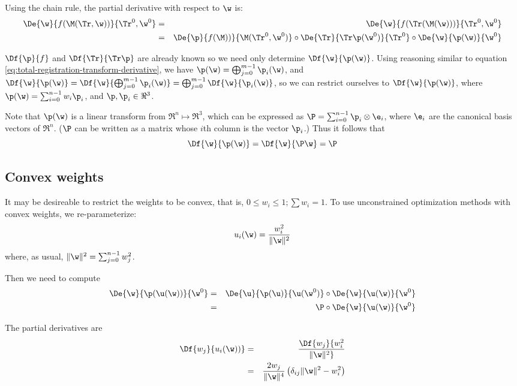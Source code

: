 Using the chain rule, the partial derivative with respect to $\w$ is:
\begin{eqnarray}
\De{\w}{f(\M(\Tr,\w))}{\Tr^0,\w^0}
& = &
\De{\w}{f(\Tr(\M(\w)))}{\Tr^0,\w^0}
\\
& = &
\De{\p}{f(\M))}{\M(\Tr^0,\w^0)}
\circ
\De{\Tr}{\Tr\p(\w^0)}{\Tr^0}
\circ
\De{\w}{\p(\w)}{\w^0}
\nonumber
\end{eqnarray}

$\Df{\p}{f}$ and $\Df{\Tr}{\Tr\p}$ are already known
so we need only determine $\Df{\w}{\p(\w)}$.
Using reasoning similar
to equation \ref{eq:total-registration-transform-derivative},
we have $\p(\w) = \bigoplus_{j=0}^{m-1} \p_i(\w)$,
and
$\Df{\w}{\p(\w)}
=
\Df{\w}{\bigoplus_{j=0}^{m-1} \p_i(\w)}
=
\bigoplus_{j=0}^{m-1} \Df{\w}{\p_i(\w)}$,
so we can restrict ourselves to
$\Df{\w}{\p(\w)}$, where $\p(\w) = \sum_{i=0}^{n-1} w_i \p_i$,
and $\p, \p_i \in \Re^3$.

Note that $\p(\w)$ is a linear transform from $\Re^n \mapsto \Re^3$,
which can be expressed as $\P = \sum_{i=0}^{n-1} \p_i \otimes \e_i$,
where $\e_i$ are the canonical basis vectors of $\Re^n$.
($\P$ can be written as a matrix whose $i$th column is the vector $\p_i$.)
Thus it follows that
\begin{equation}
\Df{\w}{\p(\w)} = \Df{\w}{\P\w} = \P
\end{equation}

\subsection{Convex weights}
\label{sec:Convex-weights}

It may be desireable to restrict the weights to be convex,
that is, $0 \leq w_i \leq 1; \sum w_i = 1$.
To use unconstrained optimization methods with convex weights,
we re-parameterize:
\begin{equation}
u_i(\w) = {{w_i^2} \over {\| \w \|^2}}
\end{equation}
where, as usual, $\| \w \|^2 = \sum_{j=0}^{n-1} w_j^2$.

Then we need to compute
\begin{eqnarray}
\De{\w}{\p(\u(\w))}{\w^0}
& = &
\De{\u}{\p(\u)}{\u(\w^0)}
\circ
\De{\w}{\u(\w)}{\w^0}
\\
& = &
\P
\circ
\De{\w}{\u(\w)}{\w^0}
\nonumber
\end{eqnarray}

The partial derivatives are
\begin{eqnarray}
\Df{w_j}{u_i(\w))}
& = &
\Df{w_j}{{w_i^2} \over {\| \w \|^2}}
\\
& = &
{{2 w_j} \over {\| \w \|^4}} \left( \delta_{ij} \| \w \|^2 - w_i^2 \right)
\nonumber
\end{eqnarray}
